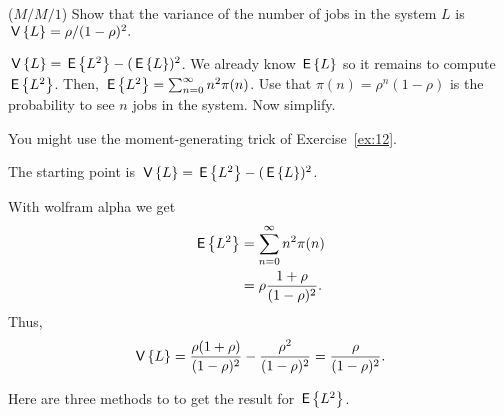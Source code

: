 \begin{exercise}($M/M/1$)
Show that the variance of the number of jobs in the system $L$ is
$\,\mathsf{V}\left\{L\right\} = \rho/(1-\rho)^2.$
  \begin{hint}
    $\,\mathsf{V}\left\{L\right\} = \,\mathsf{E}\left\{L^2\right\} - (\,\mathsf{E}\left\{L\right\})^2$. We already know $\,\mathsf{E}\left\{L\right\}$ so it remains
    to compute $\,\mathsf{E}\left\{L^2\right\}$. Then, $\,\mathsf{E}\left\{L^2 \right\}= \sum_{n=0}^\infty n^2 \pi(n)$. Use that $\pi(n)=\rho^n(1-\rho)$ is the probability to see $n$ jobs in the system. Now simplify.    

You might use the moment-generating trick of Exercise~\ref{ex:12}.
  \end{hint}
  \begin{solution}
The starting point is  $\,\mathsf{V}\left\{L\right\} = \,\mathsf{E}\left\{L^2\right\} - (\,\mathsf{E}\left\{L\right\})^2$. 

With wolfram alpha we get
    \begin{equation*}
      \begin{split}
      \,\mathsf{E}\left\{L^2 \right\}
&= \sum_{n=0}^\infty n^2 \pi(n) \\
&= \rho \frac{1+\rho}{(1-\rho)^2}.
      \end{split}
    \end{equation*}
    Thus,
\begin{equation*}
\,\mathsf{V}\left\{L\right\} = \frac{\rho(1+\rho)}{(1-\rho)^2}-\frac{\rho^2}{(1-\rho)^2} = \frac{\rho}{(1-\rho)^2}.
\end{equation*}

Here are three methods to to  get the result for $\,\mathsf{E}\left\{L^2\right\}$.  


\end{solution}
\end{exercise}
